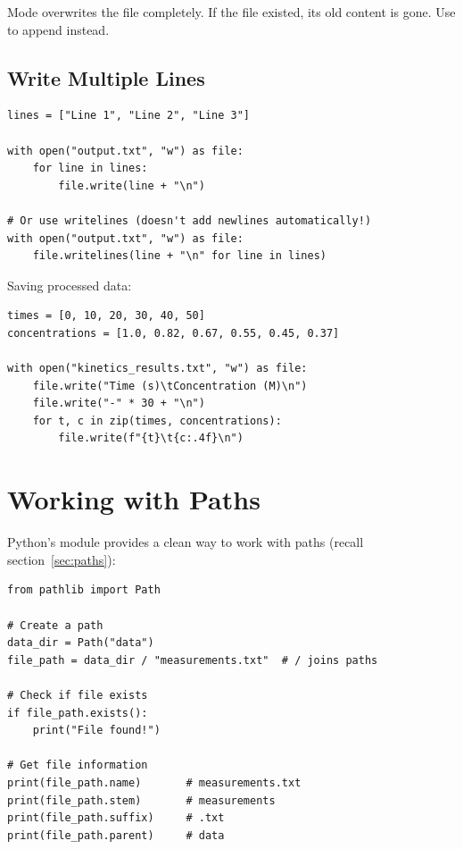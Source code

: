 \begin{labexample}
\begin{warning}
Mode  overwrites the file completely. If the file existed, its old content is gone. Use  to append instead.
\end{warning}

\subsection{Write Multiple Lines}

\begin{lstlisting}
lines = ["Line 1", "Line 2", "Line 3"]

with open("output.txt", "w") as file:
    for line in lines:
        file.write(line + "\n")

# Or use writelines (doesn't add newlines automatically!)
with open("output.txt", "w") as file:
    file.writelines(line + "\n" for line in lines)
\end{lstlisting}

\begin{labexample}
Saving processed data:

\begin{lstlisting}
times = [0, 10, 20, 30, 40, 50]
concentrations = [1.0, 0.82, 0.67, 0.55, 0.45, 0.37]

with open("kinetics_results.txt", "w") as file:
    file.write("Time (s)\tConcentration (M)\n")
    file.write("-" * 30 + "\n")
    for t, c in zip(times, concentrations):
        file.write(f"{t}\t{c:.4f}\n")
\end{lstlisting}
\end{labexample}

\section{Working with Paths}

Python's  module provides a clean way to work with paths (recall section~\ref{sec:paths}):

\begin{lstlisting}
from pathlib import Path

# Create a path
data_dir = Path("data")
file_path = data_dir / "measurements.txt"  # / joins paths

# Check if file exists
if file_path.exists():
    print("File found!")

# Get file information
print(file_path.name)       # measurements.txt
print(file_path.stem)       # measurements
print(file_path.suffix)     # .txt
print(file_path.parent)     # data


\end{lstlisting}
\end{labexample}
